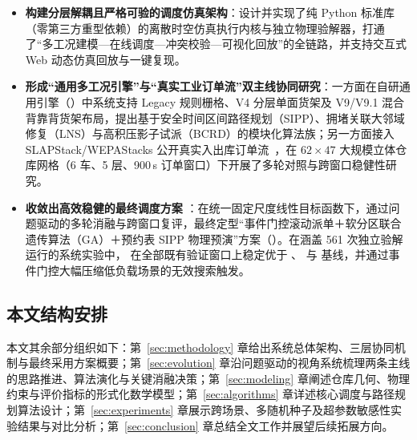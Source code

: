 \begin{itemize}
  \item \textbf{构建分层解耦且严格可验的调度仿真架构}：设计并实现了纯 Python 标准库（零第三方重型依赖）的离散时空仿真执行内核与独立物理验解器，打通了“多工况建模—在线调度—冲突校验—可视化回放”的全链路，并支持交互式 Web 动态仿真回放与一键复现。
  \item \textbf{形成“通用多工况引擎”与“真实工业订单流”双主线协同研究}：一方面在自研通用引擎（）中系统支持 Legacy 规则栅格、V4 分层单面货架及 V9/V9.1 混合背靠背货架布局，提出基于安全时间区间路径规划（SIPP）、拥堵关联大邻域修复（LNS）与高积压影子试派（BCRD）的模块化算法族；另一方面接入 SLAPStack/WEPAStacks 公开真实入出库订单流~\cite{pfrommer2022slapstack}，在 $62\times 47$ 大规模立体仓库网格（6 车、5 层、900\,s 订单窗口）下开展了多轮对照与跨窗口稳健性研究。
  \item \textbf{收敛出高效稳健的最终调度方案 }：在统一固定尺度线性目标函数下，通过问题驱动的多轮消融与跨窗口复评，最终定型“事件门控滚动派单＋软分区联合遗传算法（GA）＋预约表 SIPP 物理预演”方案（）。在涵盖 561 次独立验解运行的系统实验中， 在全部既有验证窗口上稳定优于 、 与  基线，并通过事件门控大幅压缩低负载场景的无效搜索触发。
\end{itemize}

\subsection{本文结构安排}

本文其余部分组织如下：第~\ref{sec:methodology} 章给出系统总体架构、三层协同机制与最终采用方案概要；第~\ref{sec:evolution} 章沿问题驱动的视角系统梳理两条主线的思路推进、算法演化与关键消融决策；第~\ref{sec:modeling} 章阐述仓库几何、物理约束与评价指标的形式化数学模型；第~\ref{sec:algorithms} 章详述核心调度与路径规划算法设计；第~\ref{sec:experiments} 章展示跨场景、多随机种子及超参数敏感性实验结果与对比分析；第~\ref{sec:conclusion} 章总结全文工作并展望后续拓展方向。

